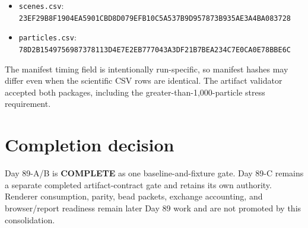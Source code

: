 \documentclass[11pt]{article}
\begin{document}
\begin{itemize}
\item \texttt{scenes.csv}: \texttt{23EF29B8F1904EA5901CBD8D079EFB10C5A537B9D957873B935AE3A4BA083728}
\item \texttt{particles.csv}: \texttt{78D2B1549756987378113D4E7E2EB777043A3DF21B7BEA234C7E0CA0E78BBE6C}
\end{itemize}

The manifest timing field is intentionally run-specific, so manifest hashes may differ even when the scientific CSV rows are identical. The artifact validator accepted both packages, including the greater-than-1,000-particle stress requirement.

\section*{Completion decision}
Day 89-A/B is \textbf{COMPLETE} as one baseline-and-fixture gate. Day 89-C remains a separate completed artifact-contract gate and retains its own authority. Renderer consumption, parity, bead packets, exchange accounting, and browser/report readiness remain later Day 89 work and are not promoted by this consolidation.
\end{document}
